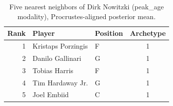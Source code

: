 \begin{table}[htbp]
  \centering\small
  \begin{tabular}{rllc}
    \toprule
    Rank & Player & Position & Archetype \\
    \midrule
    1 & Kristaps Porzingis & F & 1 \\
    2 & Danilo Gallinari & G & 1 \\
    3 & Tobias Harris & F & 1 \\
    4 & Tim Hardaway Jr. & G & 1 \\
    5 & Joel Embiid & C & 1 \\
    \bottomrule
  \end{tabular}
  \caption{Five nearest neighbors of Dirk Nowitzki (peak_age modality), Procrustes-aligned posterior mean.}
  \label{tab:Dirk_Nowitzki_neighbors_peak_age}
\end{table}

